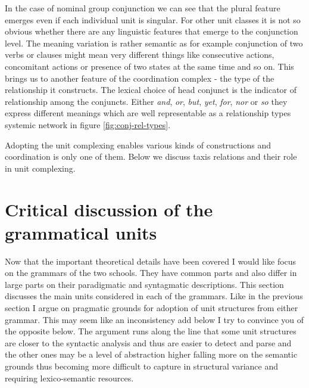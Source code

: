In the case of nominal group conjunction we can see that the plural feature emerges even if each individual unit is singular. For other unit classes it is not so obvious whether there are any linguistic features that emerge to the conjunction level. The meaning variation is rather semantic as for example conjunction of two verbs or clauses might mean very different things like consecutive actions, concomitant actions or presence of two states at the same time and so on. This brings us to another feature of the coordination complex - the type of the relationship it constructs. The lexical choice of head conjunct is the indicator of relationship among the conjuncts. Either \textit{and}, \textit{or}, \textit{but}, \textit{yet}, \textit{for}, \textit{nor} or \textit{so} they express different meanings which are well representable as a  relationship types systemic network in figure \ref{fig:conj-rel-types}.



Adopting the unit complexing enables various kinds of constructions and coordination is only one of them. Below we discuss taxis relations and their role in unit complexing.

\section{Critical discussion of the grammatical units}
\label{sec:discussion-unit-classes}

Now that the important theoretical details have been covered I would like focus on the grammars of the two schools. They have common parts and also differ in large parts on their paradigmatic and syntagmatic descriptions. This section discusses the main units considered in each of the grammars. Like in the previous section I argue on pragmatic grounds for adoption of unit structures from either grammar. This may seem like an inconsistency add below I try to convince you of the opposite below. The argument runs along the line that some unit structures are closer to the syntactic analysis and thus are easier to detect and parse and the other ones may be a level of abstraction higher falling more on the semantic grounds thus becoming more difficult to capture in structural variance and requiring lexico-semantic resources.

